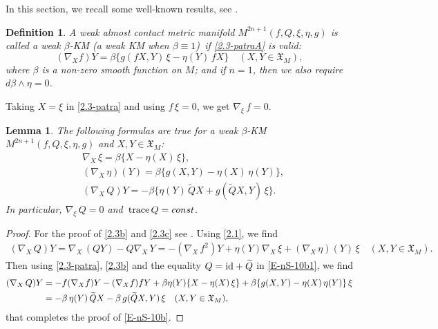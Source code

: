 \documentclass[11pt,a4paper,twoside]{article}
\newtheorem{definition}{Definition}%
\newtheorem{lemma}{Lemma}%
\def\tr{{\rm\,trace\,}}
\begin{document}
{In this section, we recall some well-known results, see \cite{rst-55,rov-126}.

\begin{definition}\label{D-wK}\rm
A weak almost contact metric manifold $M^{2n+1}(f,Q,\xi,\eta,g)$ is called a \textit{weak $\beta$-KM}
(a \textit{weak KM} when $\beta\equiv1$)~if \eqref{2.3-patraA} is valid:
\begin{equation}\label{2.3-patra}
 (\nabla_{X} f)Y=\beta\{g(f X, Y)\,\xi -\eta(Y)\,f X\}\quad (X,Y\in\mathfrak{X}_M),
\end{equation}
where $\beta$ is a non-zero smooth function on $M$; and if $n=1$, then we also require $d\beta\wedge\eta=0$.
\end{definition}

Taking $X=\xi$ in \eqref{2.3-patra} and using ${f}\,\xi=0$, we get $\nabla_{\xi}\,f=0$.

\begin{lemma}
The following formulas are true for a weak $\beta$-KM $M^{2n+1}(f,Q,\xi,\eta,g)$ and $X,Y\in\mathfrak{X}_M$:
\begin{align}\label{2.3b}
 & \nabla_{X}\,\xi = \beta\{X -\eta(X)\,\xi\}, \\
\label{2.3c}
 & (\nabla_{X}\,\eta)(Y) = \beta\{g(X,Y) -\eta(X)\,\eta(Y)\} ,\\
 \label{E-nS-10b}
 & (\nabla_X\,Q)Y = -\beta\big\{\eta(Y)\,\widetilde Q X + g(\widetilde Q X, Y)\,\xi\big\} .
\end{align}
In particular, $\nabla_\xi\,Q=0$ and $\tr Q=const$.
\end{lemma}

\begin{proof}
For the proof of \eqref{2.3b} and \eqref{2.3c} see \cite{rov-126}.
Using \eqref{2.1}, we find
\begin{align}\label{E-nS-10b1}
 (\nabla_X\,Q)Y = \nabla_X\,(QY)-Q\nabla_X\,Y = -(\nabla_X\,f^2)Y + \eta(Y)\nabla_X\,\xi + (\nabla_X\,\eta)(Y)\,\xi
  \quad (X,Y\in\mathfrak{X}_M).
\end{align}
Then using \eqref{2.3-patra}, \eqref{2.3b} and the equality $Q={\rm id}+\widetilde Q$ in \eqref{E-nS-10b1}, we find
\begin{align*}%
\notag
 (\nabla_X\,Q)Y &= -f(\nabla_X f)Y -(\nabla_X f)fY + \beta\eta(Y)\{X-\eta(X)\,\xi\} +\beta\{g(X,Y)-\eta(X)\,\eta(Y)\}\,\xi \\
 & = -\beta\,\eta(Y)\,\widetilde Q X -\beta\,g(\widetilde Q X, Y)\,\xi \quad (X,Y\in\mathfrak{X}_M),
\end{align*}
that completes the proof of \eqref{E-nS-10b}.
\end{proof}

}
\end{document}
